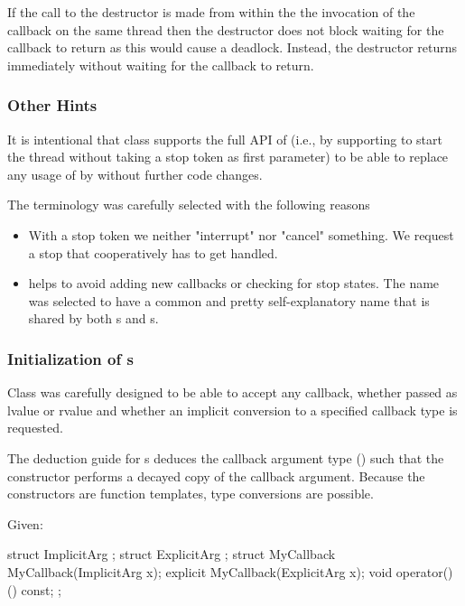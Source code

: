If the call to the  destructor is made from within the the
invocation of the callback on the same thread then the destructor does not block
waiting for the callback to return as this would cause a deadlock. Instead,
the destructor returns immediately without waiting for the callback to return.

\subsubsection*{Other Hints}

It is intentional that class  supports the full API of 
(i.e., by supporting to start the thread without taking a stop token as first parameter)
to be able to replace any usage of  by 
without further code changes.

The terminology was carefully selected with the following reasons
\begin{itemize}
 \item With a stop token we neither "interrupt" nor "cancel" something.
        We request a stop that cooperatively has to get handled.
 \item {} helps to avoid adding new callbacks
        or checking for stop states.
        The name was selected to have a common and pretty self-explanatory name
        that is shared by both s and s.
\end{itemize}

\subsubsection*{Initialization of s}

Class  was carefully designed to be able to accept any callback,
whether passed as lvalue or rvalue and whether an implicit conversion
to a specified callback type is requested.

The deduction guide for s deduces the callback argument type
()
such that the constructor performs a decayed copy of the callback argument.
Because the constructors are function templates,
type conversions are possible.

Given:
\begin{codeblock}
struct ImplicitArg {
};
struct ExplicitArg {
};
struct MyCallback {
  MyCallback(ImplicitArg x);
  explicit MyCallback(ExplicitArg x);
  void operator()() const;
};
\end{codeblock}

